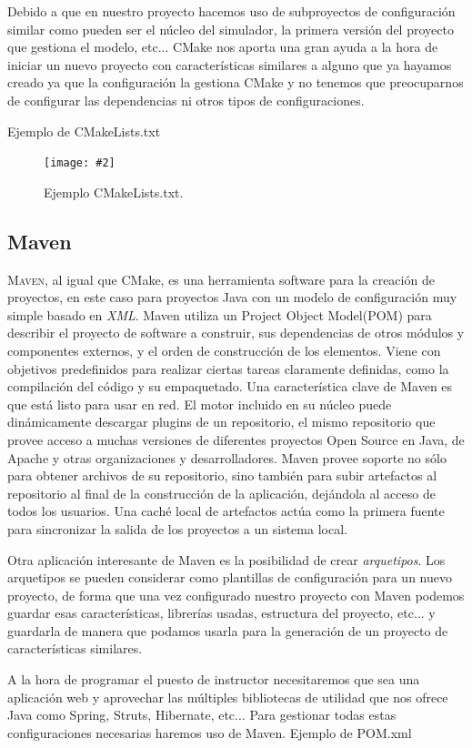\documentclass[12pt,a4paper,spanish]{book} %
\newcommand{\imgCentrada}[3]{
\begin{figure}[H]
\begin{center}
\texttt{[image: \#2]}
\caption{#3}
\label{#1}
\end{center}
\end{figure}
}
\begin{document}
Debido a que en nuestro proyecto hacemos uso de subproyectos de configuración similar como pueden ser el núcleo del simulador, la primera versión del proyecto que gestiona el modelo, etc... CMake nos aporta una gran ayuda a la hora de iniciar un nuevo proyecto con características similares a alguno que ya hayamos creado ya que la configuración la gestiona CMake y no tenemos que preocuparnos de configurar las dependencias ni otros tipos de configuraciones.

Ejemplo de CMakeLists.txt

\imgCentrada{fig.2.14}{img/cmakelists.eps}{Ejemplo CMakeLists.txt.}

\newpage
\subsection{Maven}

\lettrine{M}{aven}, al igual que CMake, es una herramienta software para la creación de proyectos, en este caso para proyectos Java con un modelo de configuración muy simple basado en \emph{XML}. Maven utiliza un Project Object Model(POM) para describir el proyecto de software a construir, sus dependencias de otros módulos y componentes externos, y el orden de construcción de los elementos. Viene con objetivos predefinidos para realizar ciertas tareas claramente definidas, como la compilación del código y su empaquetado. Una característica clave de Maven es que está listo para usar en red. El motor incluido en su núcleo puede dinámicamente descargar plugins de un repositorio, el mismo repositorio que provee acceso a muchas versiones de diferentes proyectos Open Source en Java, de Apache y otras organizaciones y desarrolladores. Maven provee soporte no sólo para obtener archivos de su repositorio, sino también para subir artefactos al repositorio al final de la construcción de la aplicación, dejándola al acceso de todos los usuarios. Una caché local de artefactos actúa como la primera fuente para sincronizar la salida de los proyectos a un sistema local.

Otra aplicación interesante de Maven es la posibilidad de crear \emph{arquetipos}. Los arquetipos se pueden considerar como plantillas de configuración para un nuevo proyecto, de forma que una vez configurado nuestro proyecto con Maven podemos guardar esas características, librerías usadas, estructura del proyecto, etc... y guardarla de manera que podamos usarla para la generación de un proyecto de características similares.

A la hora de programar el puesto de instructor necesitaremos que sea una aplicación web y aprovechar las múltiples bibliotecas de utilidad que nos ofrece Java como Spring, Struts, Hibernate, etc... Para gestionar todas estas configuraciones necesarias haremos uso de Maven.
\newpage
Ejemplo de POM.xml
\end{document}
